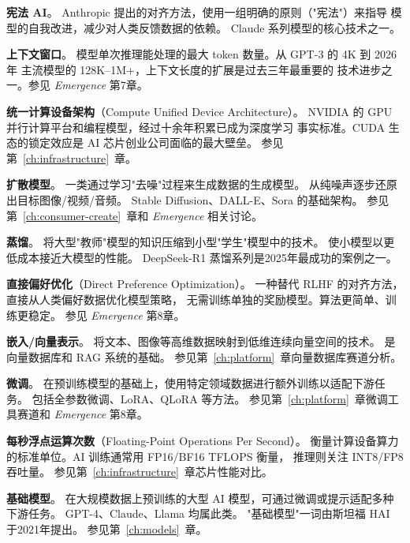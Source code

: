 \begin{description}[style=nextline, leftmargin=2.5cm, labelwidth=2.3cm, font=\bfseries]
\item[Constitutional AI]
\textbf{宪法 AI}。
Anthropic 提出的对齐方法，使用一组明确的原则（"宪法"）来指导
模型的自我改进，减少对人类反馈数据的依赖。
Claude 系列模型的核心技术之一。

\item[Context Window]
\textbf{上下文窗口}。
模型单次推理能处理的最大 token 数量。从 GPT-3 的 4K 到 2026 年
主流模型的 128K--1M+，上下文长度的扩展是过去三年最重要的
技术进步之一。参见 \textit{Emergence} 第7章。

\item[CUDA]
\textbf{统一计算设备架构}（Compute Unified Device Architecture）。
NVIDIA 的 GPU 并行计算平台和编程模型，经过十余年积累已成为深度学习
事实标准。CUDA 生态的锁定效应是 AI 芯片创业公司面临的最大壁垒。
参见第~\ref{ch:infrastructure}~章。

\item[Diffusion Model]
\textbf{扩散模型}。
一类通过学习"去噪"过程来生成数据的生成模型。
从纯噪声逐步还原出目标图像/视频/音频。
Stable Diffusion、DALL-E、Sora 的基础架构。
参见第~\ref{ch:consumer-create}~章和 \textit{Emergence} 相关讨论。

\item[Distillation]
\textbf{蒸馏}。
将大型"教师"模型的知识压缩到小型"学生"模型中的技术。
使小模型以更低成本接近大模型的性能。
DeepSeek-R1 蒸馏系列是2025年最成功的案例之一。

\item[DPO]
\textbf{直接偏好优化}（Direct Preference Optimization）。
一种替代 RLHF 的对齐方法，直接从人类偏好数据优化模型策略，
无需训练单独的奖励模型。算法更简单、训练更稳定。
参见 \textit{Emergence} 第8章。

\item[Embedding]
\textbf{嵌入/向量表示}。
将文本、图像等高维数据映射到低维连续向量空间的技术。
是向量数据库和 RAG 系统的基础。
参见第~\ref{ch:platform}~章向量数据库赛道分析。

\item[Fine-tuning]
\textbf{微调}。
在预训练模型的基础上，使用特定领域数据进行额外训练以适配下游任务。
包括全参数微调、LoRA、QLoRA 等方法。
参见第~\ref{ch:platform}~章微调工具赛道和 \textit{Emergence} 第8章。

\item[FLOPS]
\textbf{每秒浮点运算次数}（Floating-Point Operations Per Second）。
衡量计算设备算力的标准单位。AI 训练通常用 FP16/BF16 TFLOPS 衡量，
推理则关注 INT8/FP8 吞吐量。
参见第~\ref{ch:infrastructure}~章芯片性能对比。

\item[Foundation Model]
\textbf{基础模型}。
在大规模数据上预训练的大型 AI 模型，可通过微调或提示适配多种下游任务。
GPT-4、Claude、Llama 均属此类。
"基础模型"一词由斯坦福 HAI 于2021年提出。
参见第~\ref{ch:models}~章。


\end{description}
